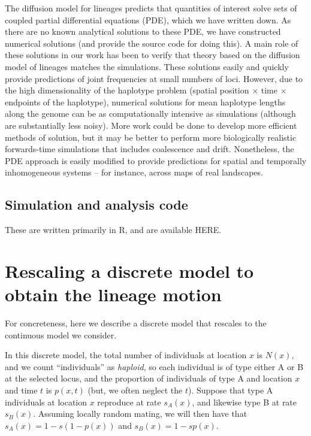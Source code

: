 \documentclass[11pt,letterpaper]{article}
\begin{document}
The diffusion model for lineages predicts that quantities of interest solve sets of coupled partial differential equations (PDE),
which we have written down.
As there are no known analytical solutions to these PDE,
we have constructed numerical solutions (and provide the source code for doing this).
A main role of these solutions in our work has been to verify that theory based on the diffusion model of lineages
matches the simulations.
These solutions easily and quickly provide predictions of joint frequencies at small numbers of loci.
However, due to the high dimensionality of the haplotype problem (spatial position $\times$ time $\times$ endpoints of the haplotype),
numerical solutions for mean haplotype lengths along the genome can be as computationally intensive as simulations
(although are substantially less noisy).
More work could be done to develop more efficient methods of solution,
but it may be better to perform more biologically realistic forwards-time simulations that includes coalescence and drift.
Nonetheless, the PDE approach is easily modified to provide predictions for spatial and temporally inhomogeneous systems --
for instance, across maps of real landscapes.


\subsection*{Simulation and analysis code}

These are written primarily in R, and are available HERE.




\appendix
\setcounter{table}{0}
\renewcommand{\thetable}{S\arabic{table}}
\setcounter{figure}{0}
\renewcommand{\thefigure}{S\arabic{figure}}


\section{Rescaling a discrete model to obtain the lineage motion}
\label{apx:lineage_derivation}

For concreteness, here we describe a discrete model that rescales to the continuous model we consider.

In this discrete model, the total number of individuals at location $x$ is $N(x)$,
and we count ``individuals'' as \emph{haploid},
so each individual is of type either A or B at the selected locus,
and the proportion of individuals of type A and location $x$ and time $t$ is $p(x,t)$
(but, we often neglect the $t$).
Suppose that type A individuals at location $x$ reproduce at rate $s_A(x)$, 
and likewise type B at rate $s_B(x)$.
Assuming locally random mating, we will then have that
$s_A(x) = 1 - s (1-p(x))$ and $s_B(x) = 1 - s p(x)$.
\end{document}
